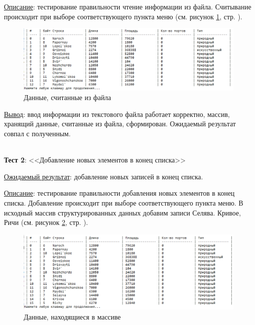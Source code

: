 \underline{Описание}: тестирование правильности чтение информации из файла. Считывание происходит при выборе соответствующего пункта меню (см. рисунок \ref{fig:data_tsv}, стр. \pageref{fig:data_tsv}).


\begin{figure}[!hp]
    \begin{center}
        \includegraphics[width=16cm]{_input/tests/data-tsv.png}
    \end{center}
    \caption{Данные, считанные из файла\label{fig:data_tsv}}
\end{figure}

\underline{Вывод}: ввод информации из текстового файла работает корректно, массив, хранящий данные, считанные из файла, сформирован. Ожидаемый результат совпал с полученным. 

\hspace{0pt}\\



\textbf{Тест 2}: <<Добавление новых элементов в конец списка>>

\underline{Ожидаемый результат}: добавление новых записей в конец списка.

\underline{Описание}: тестирование правильности добавления новых элементов в конец списка. Добавление происходит при выборе соответствующего пункта меню. В исходный массив структурированных данных добавим записи Селява. Кривое, Ричи (см. рисунок \ref{fig:data_tsv_2}, стр. \pageref{fig:data_tsv_2}).


\begin{figure}[!hp]
    \begin{center}
        \includegraphics[width=16cm]{_input/tests/data-tsv-2.png}
    \end{center}
    \caption{Данные, находящиеся в массиве\label{fig:data_tsv_2}}
\end{figure}

